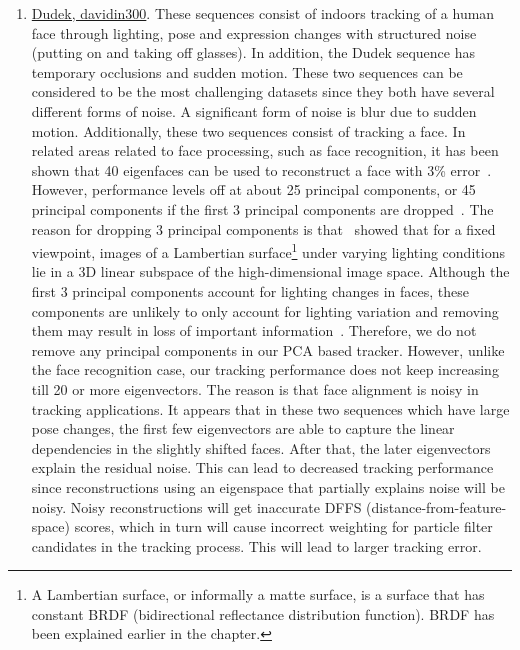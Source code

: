 \begin{enumerate}
\item \underline{Dudek, davidin300}.  These sequences consist of indoors tracking of a human face through lighting, pose and expression changes with structured noise (putting on and taking off glasses).  In addition, the Dudek sequence has temporary occlusions and sudden motion.  These two sequences can be considered to be the most challenging datasets since they both have several different forms of noise.  A significant form of noise is blur due to sudden motion.  Additionally, these two sequences consist of tracking a face.  In related areas related to face processing, such as face recognition, it has been shown that 40 eigenfaces can be used to reconstruct a face with 3\% error~\cite{1987_JNL_Faces_Sirovich}.  However, performance levels off at about 25 principal components, or 45 principal components if the first 3 principal components are dropped~\cite{1997_JNL_EigenVsFisherFaces_Bel}.  The reason for dropping 3 principal components is that~\cite{1992_THE_GeoPhoto_Shashua} showed that for a fixed viewpoint, images of a Lambertian surface\footnote{A Lambertian surface, or informally a matte surface, is a surface that has constant BRDF (bidirectional reflectance distribution function).  BRDF has been explained earlier in the chapter.} under varying lighting conditions lie in a 3D linear subspace of the high-dimensional image space.  Although the first 3 principal components account for lighting changes in faces, these components are unlikely to only account for lighting variation and removing them may result in loss of important information~\cite{1997_JNL_EigenVsFisherFaces_Bel}.  Therefore, we do not remove any principal components in our PCA based tracker.  However, unlike the face recognition case, our tracking performance does not keep increasing till 20 or more eigenvectors.  The reason is that face alignment is noisy in tracking applications.  It appears that in these two sequences which have large pose changes, the first few eigenvectors are able to capture the linear dependencies in the slightly shifted faces.  After that, the later eigenvectors explain the residual noise.  This can lead to decreased tracking performance since reconstructions using an eigenspace that partially explains noise will be noisy.  Noisy reconstructions will get inaccurate DFFS (distance-from-feature-space) scores, which in turn will cause incorrect weighting for particle filter candidates in the tracking process.  This will lead to larger tracking error.
  

\end{enumerate}
